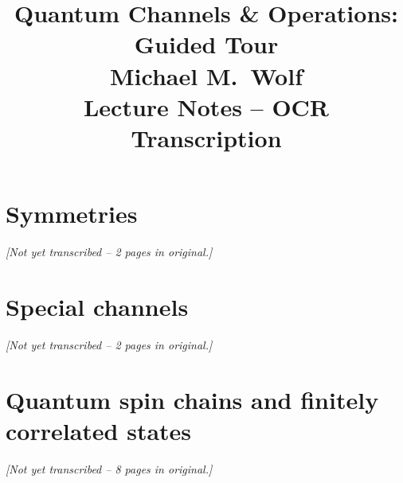 \documentclass[11pt,a4paper]{book}
\title{\textbf{Quantum Channels \& Operations: Guided Tour}\\[1em]
       {\Large Michael M.\ Wolf}\\[0.5em]
       {\large Lecture Notes -- OCR Transcription}}
\author{}
\date{}
\begin{document}
\maketitle
\tableofcontents

\def\maketitle{}
\def\tableofcontents{}



















\setcounter{chapter}{8}
\chapter{Symmetries}
\emph{[Not yet transcribed -- 2 pages in original.]}

\chapter{Special channels}
\emph{[Not yet transcribed -- 2 pages in original.]}

\chapter{Quantum spin chains and finitely correlated states}
\emph{[Not yet transcribed -- 8 pages in original.]}
\end{document}
